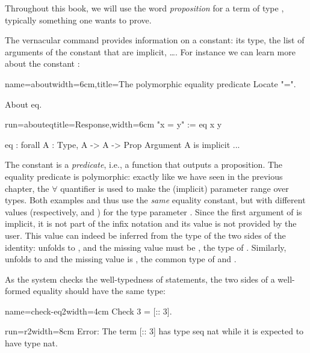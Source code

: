 Throughout this book, we will
use the word \emph{proposition} for a term of type , typically
something one wants to prove.

The  vernacular
command provides information on a constant: its type, the list
of arguments of the constant that are implicit, \dots. For instance
we can learn more about the constant :

\begin{coq-left}{name=about}{width=6cm,title=The polymorphic equality predicate}
Locate "=".

About eq.
$~$
\end{coq-left}
\begin{coqout-right}{run=abouteq}{title=Response,width=6cm}
"x = y" := eq x y

eq : forall A : Type, A -> A -> Prop
Argument A is implicit ...
\end{coqout-right}

The constant  is a \emph{predicate}, i.e., a function that
outputs a proposition. The equality
predicate is polymorphic: exactly like we have seen in the previous
chapter, the $\forall$  quantifier is used to make the (implicit)
parameter  range over types.
Both examples  and  thus use the \emph{same} equality constant, but with
different values (respectively,  and ) for the type
parameter . Since the first argument of  is implicit, it is not
part of the infix notation and its value is not
provided by the user. This value can indeed be inferred from the type of the
two sides of the identity:  unfolds to , and
the missing value must be , the type of . Similarly,
 unfolds to 
and the missing value is , the common type of  and
.

As the \Coq{} system checks the well-typedness of statements,
the two sides of a well-formed equality should have the same
type:

\begin{coq-left}{name=check-eq2}{width=4cm}
Check 3 = [:: 3].
$~$
\end{coq-left}
\begin{coqout-right}{run=r2}{width=8cm}
Error: The term [:: 3] has type seq nat
 while it is expected to have type nat.
\end{coqout-right}

